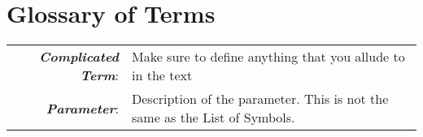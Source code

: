 \chapter*{Glossary of Terms}
\label{glossary}
\begin{longtable}{r p{}}
    \textbf{\textit{Complicated Term}}: & Make sure to define anything that you allude to in the text\\
    \textbf{\textit{Parameter}}: & Description of the parameter. This is not the same as the List of Symbols. \\
\end{longtable}